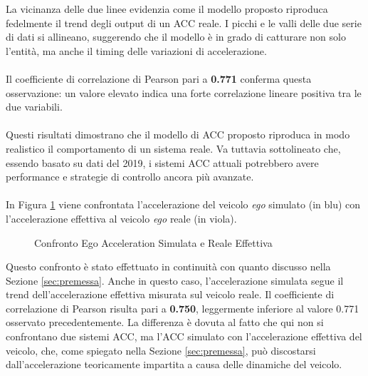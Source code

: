\noindent La vicinanza delle due linee evidenzia come il modello proposto riproduca fedelmente il trend degli output di un ACC reale.  
I picchi e le valli delle due serie di dati si allineano, suggerendo che il modello è in grado di catturare 
non solo l'entità, ma anche il timing delle variazioni di accelerazione.  
\\\\
\noindent Il coefficiente di correlazione di Pearson pari a \textbf{0.771} conferma questa osservazione: un valore elevato indica 
una forte correlazione lineare positiva tra le due variabili.
\\\\
\noindent Questi risultati dimostrano che il modello di ACC proposto riproduca in modo realistico il comportamento 
di un sistema reale. Va tuttavia sottolineato che, essendo basato su dati del 2019, i sistemi ACC attuali potrebbero 
avere performance e strategie di controllo ancora più avanzate.
\\\\
\noindent In Figura \ref{fig:acceleration_effettiva} viene confrontata l'accelerazione del veicolo \emph{ego} simulato (in blu) 
con l'accelerazione effettiva al veicolo \emph{ego} reale (in viola). 
\begin{figure}[H]
    \centering
    \caption{Confronto Ego Acceleration Simulata e Reale Effettiva}
    \label{fig:acceleration_effettiva}
\end{figure}
\noindent Questo confronto è stato effettuato in continuità con quanto discusso nella Sezione \ref{sec:premessa}.  
Anche in questo caso, l'accelerazione simulata segue il trend dell'accelerazione effettiva misurata sul veicolo reale.  
Il coefficiente di correlazione di Pearson risulta pari a \textbf{0.750}, leggermente inferiore al valore 0.771 osservato 
precedentemente. La differenza è dovuta al fatto che qui non si confrontano due sistemi ACC, ma l'ACC simulato con l'accelerazione 
effettiva del veicolo, che, come spiegato nella Sezione \ref{sec:premessa}, può discostarsi dall'accelerazione teoricamente 
impartita a causa delle dinamiche del veicolo.

